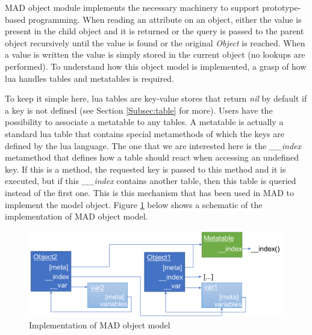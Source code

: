 
MAD object module implements the necessary machinery to support prototype-based
programming. When reading an attribute on an object, either the value is present
in the child object and it is returned or the query is passed to the parent
object recursively until the value is found or the original \emph{Object} is
reached. When a value is written the value is simply stored in the current
object (no lookups are performed). To understand how this object model is
implemented, a grasp of how lua handles tables and metatables is required.

To keep it simple here, lua tables are key-value stores that return \emph{nil} by
default if a key is not defined (see Section \ref{Subsec:table} for more).
Users have the possibility to associate a metatable to any tables. A metatable
is actually a standard lua table that contains special metamethods of which
the keys are defined by the lua language. The one that we are interested here is
the \emph{\_\_index} metamethod that defines how a table should react when accessing
an undefined key. If this is a method, the requested key is passed to this method
and it is executed, but if this \emph{\_\_index} contains another table, then this
table is queried instead of the first one. This is this mechanism that has been
used in MAD to implement the model object. Figure \ref{fig:MO-descriptinon} below
shows a schematic of the implementation of MAD object model.

\begin{figure}[H]
    \centering
    \includegraphics[width=\textwidth]{./Images/MO.pdf}
    \caption{Implementation of MAD object model}
    \label{fig:MO-descriptinon}
\end{figure}

